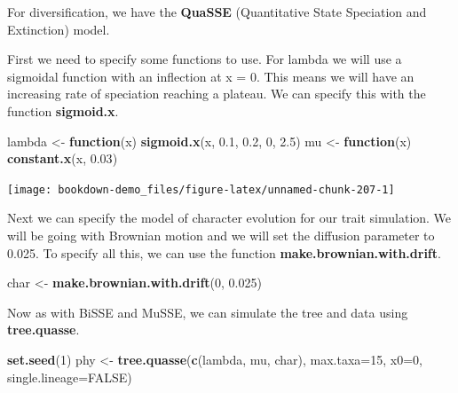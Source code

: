 \documentclass[
]{book}
\newenvironment{Shaded}{\begin{snugshade}}{\end{snugshade}}
\newcommand{\ControlFlowTok}[1]{\textcolor[rgb]{0.13,0.29,0.53}{\textbf{#1}}}
\newcommand{\DataTypeTok}[1]{\textcolor[rgb]{0.13,0.29,0.53}{#1}}
\newcommand{\DecValTok}[1]{\textcolor[rgb]{0.00,0.00,0.81}{#1}}
\newcommand{\FloatTok}[1]{\textcolor[rgb]{0.00,0.00,0.81}{#1}}
\newcommand{\KeywordTok}[1]{\textcolor[rgb]{0.13,0.29,0.53}{\textbf{#1}}}
\newcommand{\NormalTok}[1]{#1}
\newcommand{\OtherTok}[1]{\textcolor[rgb]{0.56,0.35,0.01}{#1}}
\newcommand{\StringTok}[1]{\textcolor[rgb]{0.31,0.60,0.02}{#1}}
\begin{document}
For diversification, we have the \textbf{QuaSSE} (Quantitative State Speciation and Extinction) model.

First we need to specify some functions to use. For lambda we will use a sigmoidal function with an inflection at x = 0. This means we will have an increasing rate of speciation reaching a plateau. We can specify this with the function \textbf{sigmoid.x}.

\begin{Shaded}
\begin{Highlighting}[]
\NormalTok{lambda \textless{}{-}}\StringTok{ }\ControlFlowTok{function}\NormalTok{(x) }\KeywordTok{sigmoid.x}\NormalTok{(x, }\FloatTok{0.1}\NormalTok{, }\FloatTok{0.2}\NormalTok{, }\DecValTok{0}\NormalTok{, }\FloatTok{2.5}\NormalTok{)}
\NormalTok{mu \textless{}{-}}\StringTok{ }\ControlFlowTok{function}\NormalTok{(x) }\KeywordTok{constant.x}\NormalTok{(x, }\FloatTok{0.03}\NormalTok{)}
\end{Highlighting}
\end{Shaded}

\begin{center}\texttt{[image: bookdown-demo\_files/figure-latex/unnamed-chunk-207-1]} \end{center}

Next we can specify the model of character evolution for our trait simulation. We will be going with Brownian motion and we will set the diffusion parameter to 0.025. To specify all this, we can use the function \textbf{make.brownian.with.drift}.

\begin{Shaded}
\begin{Highlighting}[]
\NormalTok{char \textless{}{-}}\StringTok{ }\KeywordTok{make.brownian.with.drift}\NormalTok{(}\DecValTok{0}\NormalTok{, }\FloatTok{0.025}\NormalTok{)}
\end{Highlighting}
\end{Shaded}

Now as with BiSSE and MuSSE, we can simulate the tree and data using \textbf{tree.quasse}.

\begin{Shaded}
\begin{Highlighting}[]
\KeywordTok{set.seed}\NormalTok{(}\DecValTok{1}\NormalTok{)}
\NormalTok{phy \textless{}{-}}\StringTok{ }\KeywordTok{tree.quasse}\NormalTok{(}\KeywordTok{c}\NormalTok{(lambda, mu, char), }\DataTypeTok{max.taxa=}\DecValTok{15}\NormalTok{, }\DataTypeTok{x0=}\DecValTok{0}\NormalTok{, }\DataTypeTok{single.lineage=}\OtherTok{FALSE}\NormalTok{)}
\end{Highlighting}
\end{Shaded}
\end{document}
